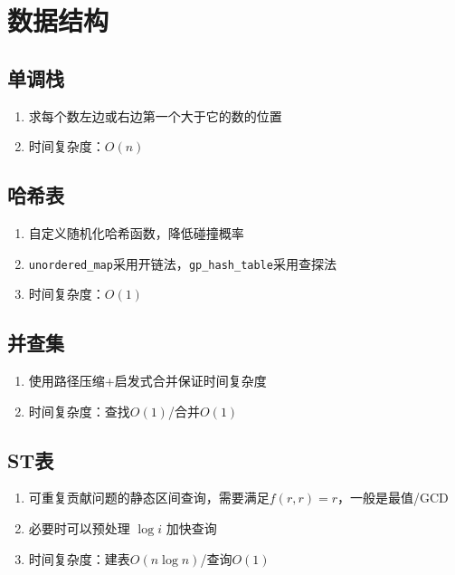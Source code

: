 \documentclass[twocolumn,a4,8pt]{article}  %
\begin{document}
	\section{数据结构}
		\subsection{单调栈}
			\noindent\begin{enumerate}
				\item 求每个数左边或右边第一个大于它的数的位置
		 		\item 时间复杂度：$O(n)$
			\end{enumerate}
			
			
		\subsection{哈希表}
			\noindent\begin{enumerate}
				\item 自定义随机化哈希函数，降低碰撞概率
				\item \texttt{unordered\_map}采用开链法，\texttt{gp\_hash\_table}采用查探法
		 		\item 时间复杂度：$O(1)$
			\end{enumerate}
			
	 	 	
	 	\subsection{并查集}
			\noindent\begin{enumerate}
				\item 使用路径压缩+启发式合并保证时间复杂度
				\item 时间复杂度：查找$O(1)$/合并$O(1)$
			\end{enumerate}
	 	 	
			
		\subsection{ST表}
			\noindent\begin{enumerate}
				\item 可重复贡献问题的静态区间查询，需要满足$f(r,r)=r$，一般是最值/GCD
				\item 必要时可以预处理 $\log i$ 加快查询
				\item 时间复杂度：建表$O(n\log n)$/查询$O(1)$
			\end{enumerate}
	 	 	
	 	 	
\end{document}

